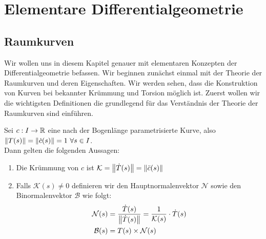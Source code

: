 \chapter{Elementare Differentialgeometrie}
\section{Raumkurven}
Wir wollen uns in diesem Kapitel genauer mit elementaren Konzepten der Differentialgeometrie befassen. Wir beginnen zunächst einmal mit der Theorie der Raumkurven und deren Eigenschaften. Wir werden sehen, dass die Konstruktion von Kurven bei bekannter Krümmung und Torsion möglich ist. Zuerst wollen wir die  wichtigsten Definitionen die grundlegend für das Verständnis der Theorie der Raumkurven sind einführen.
\begin{defs}
	Sei $c: I \rightarrow \mathbb{R}$ eine nach der Bogenlänge parametrisierte Kurve, also $\norm{T(s)} = \norm{\dot{c}(s)} = 1 \ \forall s \in I$. \\
	Dann gelten die folgenden Aussagen:
\begin{enumerate}
	\item Die Krümmung von $c$ ist $\mathcal{K} = \norm{\dot{T}(s)} = \norm{\ddot{c}(s)}$
	\item Falls $\mathcal{K}(s) \neq 0$ definieren wir den Hauptnormalenvektor $\mathcal{N}$ sowie den Binormalenvektor $\mathcal{B}$ wie folgt:
	\begin{align}
	\mathcal{N}(s) &= \frac{\dot{T}(s)}{\norm{\dot{T}(s)}} = \frac{1}{\mathcal{K}(s)}\cdot\dot{T}(s) \\
		 \mathcal{B}(s) &= T(s) \times \mathcal{N}(s)
	\end{align}
\end{enumerate}
\end{defs}

